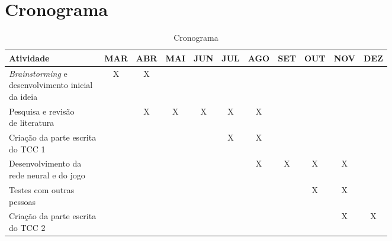 \chapter[Cronograma]{Cronograma}\label{capitulo6}

\begin{table}[ht]
    \centering
    \caption{Cronograma}
    \begin{adjustbox}{max width=\textwidth}
    \begin{tabular}{|p{5cm}|c|c|c|c|c|c|c|c|c|c|}
        \hline
        Atividade & MAR & ABR & MAI & JUN & JUL & AGO & SET & OUT & NOV & DEZ \\
        \hline
        \parbox[t]{5cm}{\textit{Brainstorming} e \\ desenvolvimento inicial \\ da ideia} & X & X &  &  &  &  &  &  &  &  \\
        \hline
        \parbox[t]{5cm}{Pesquisa e revisão \\ de literatura} &  & X & X & X & X & X &  &  &  &  \\
        \hline
        \parbox[t]{5cm}{Criação da parte escrita \\ do TCC 1} &  &  &  &  & X & X &  &  &  &  \\
        \hline
        \parbox[t]{5cm}{Desenvolvimento da \\ rede neural e do jogo} &  &  &  &  &  & X & X & X & X &  \\
        \hline
        \parbox[t]{5cm}{Testes com outras \\ pessoas} &  &  &  &  &  &  &  & X & X &  \\
        \hline
        \parbox[t]{5cm}{Criação da parte escrita \\ do TCC 2} &  &  &  &  &  &  &  &  & X & X \\
        \hline
    \end{tabular}
    \end{adjustbox}
    \label{tab:tabela11x6}
\end{table}